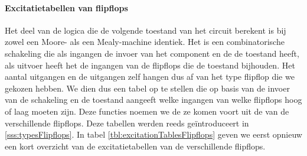 \paragraph{Excitatietabellen van flipflops}Het deel van de logica die de volgende toestand van het circuit berekent is bij zowel een Moore- als een Mealy-machine identiek. Het is een combinatorische schakeling die als ingangen de invoer van het component en de de toestand heeft, als uitvoer heeft het de ingangen van de flipflops die de toestand bijhouden. Het aantal uitgangen en de uitgangen zelf hangen dus af van het type flipflop die we gekozen hebben. We dien dus een tabel op te stellen die op basis van de invoer van de schakeling en de toestand aangeeft welke ingangen van welke flipflops hoog of laag moeten zijn. Deze functies noemen we de  ze komen voort uit de  van de verschillende flipflops. Deze tabellen werden reeds ge\"introduceert in \ref{sss:typesFlipflops}. In tabel \ref{tbl:excitationTablesFlipflops} geven we eerst opnieuw een kort overzicht van de excitatietabellen van de verschillende flipflops.
\begin{table}[hbt]
\centering
{}
\caption{Excitatietabellen van de verschillende flipflops}
\label{tbl:excitationTablesFlipflops}
\end{table}
